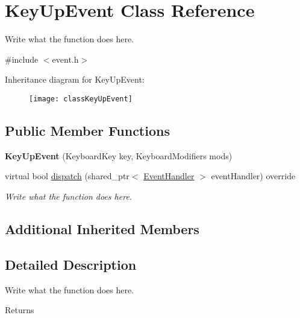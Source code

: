 \hypertarget{classKeyUpEvent}{\section{Key\+Up\+Event Class Reference}
\label{classKeyUpEvent}
}


Write what the function does here.  




{\ttfamily \#include $<$event.\+h$>$}

Inheritance diagram for Key\+Up\+Event\+:\begin{figure}[H]
\begin{center}
\leavevmode
\texttt{[image: classKeyUpEvent]}
\end{center}
\end{figure}
\subsection*{Public Member Functions}
\begin{DoxyCompactItemize}
\item 
\hypertarget{classKeyUpEvent_a26f3177d7dc9887e87fbea4f5dded283}{{\bfseries Key\+Up\+Event} (Keyboard\+Key key, Keyboard\+Modifiers mods)}\label{classKeyUpEvent_a26f3177d7dc9887e87fbea4f5dded283}

\item 
virtual bool \hyperlink{classKeyUpEvent_a24d061fc9e6559908c91972376d4a3d4}{dispatch} (shared\+\_\+ptr$<$ \hyperlink{structEventHandler}{Event\+Handler} $>$ event\+Handler) override
\begin{DoxyCompactList}\small\item\em Write what the function does here. \end{DoxyCompactList}\end{DoxyCompactItemize}
\subsection*{Additional Inherited Members}


\subsection{Detailed Description}
Write what the function does here. 

\begin{DoxyReturn}{Returns}

\end{DoxyReturn}


